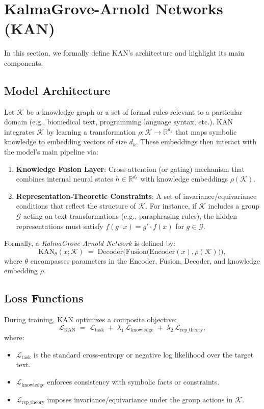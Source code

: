 \documentclass[11pt]{article}
\begin{document}
\section{KalmaGrove-Arnold Networks (KAN)}
\label{sec:kan_overview}
In this section, we formally define KAN's architecture and highlight its main components.

\subsection{Model Architecture}
Let $\mathcal{K}$ be a knowledge graph or a set of formal rules relevant to a particular domain (e.g., biomedical text, programming language syntax, etc.). KAN integrates $\mathcal{K}$ by learning a transformation $\rho : \mathcal{K} \to \mathbb{R}^{d_k}$ that maps symbolic knowledge to embedding vectors of size $d_k$. These embeddings then interact with the model's main pipeline via:
\begin{enumerate}
    \item \textbf{Knowledge Fusion Layer}: Cross-attention (or gating) mechanism that combines internal neural states $h \in \mathbb{R}^{d_h}$ with knowledge embeddings $\rho(\mathcal{K})$.
    \item \textbf{Representation-Theoretic Constraints}: A set of invariance/equivariance conditions that reflect the structure of $\mathcal{K}$. For instance, if $\mathcal{K}$ includes a group $\mathcal{G}$ acting on text transformations (e.g., paraphrasing rules), the hidden representations must satisfy $f(g \cdot x) = g' \cdot f(x)$ for $g \in \mathcal{G}$.
\end{enumerate}

Formally, a \emph{KalmaGrove-Arnold Network} is defined by:
\[
    \mathrm{KAN}_{\theta}(x; \mathcal{K}) \;=\; \mathrm{Decoder}\Big(\mathrm{Fusion}\big(\mathrm{Encoder}(x), \rho(\mathcal{K})\big)\Big),
\]
where $\theta$ encompasses parameters in the Encoder, Fusion, Decoder, and knowledge embedding $\rho$.

\subsection{Loss Functions}
During training, KAN optimizes a composite objective:
\[
    \mathcal{L}_{\mathrm{KAN}} \;=\; \mathcal{L}_{\mathrm{task}} \;+\; \lambda_1 \, \mathcal{L}_{\mathrm{knowledge}} \;+\; \lambda_2 \, \mathcal{L}_{\mathrm{rep\_theory}},
\]
where:
\begin{itemize}
    \item $\mathcal{L}_{\mathrm{task}}$ is the standard cross-entropy or negative log likelihood over the target text.
    \item $\mathcal{L}_{\mathrm{knowledge}}$ enforces consistency with symbolic facts or constraints.
    \item $\mathcal{L}_{\mathrm{rep\_theory}}$ imposes invariance/equivariance under the group actions in $\mathcal{K}$.
\end{itemize}
\end{document}

